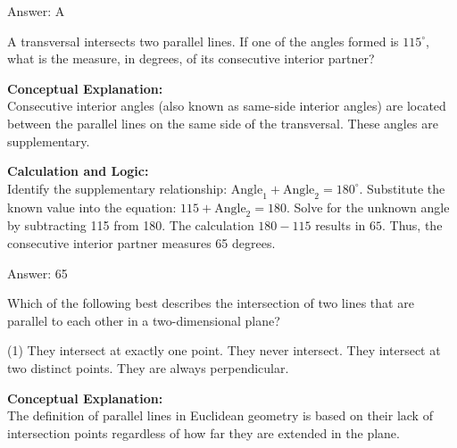 \documentclass[11pt,paper=a4,answers]{exam}
\begin{document}
\begin{questions}
\begin{solution}
\vspace{30pt}

Answer: \colorbox{yellow!100}{A}
\end{solution}

\vspace{60pt}

\question
A transversal intersects two parallel lines. If one of the angles formed is $115^\circ$, what is the measure, in degrees, of its consecutive interior partner?

\begin{solution}
\textbf{Conceptual Explanation:} \\
Consecutive interior angles (also known as same-side interior angles) are located between the parallel lines on the same side of the transversal. These angles are supplementary.

\vspace{30pt}

\textbf{Calculation and Logic:} \\
Identify the supplementary relationship: $\text{Angle}_1 + \text{Angle}_2 = 180^\circ$. Substitute the known value into the equation: $115 + \text{Angle}_2 = 180$. Solve for the unknown angle by subtracting 115 from 180. The calculation $180 - 115$ results in $65$. Thus, the consecutive interior partner measures 65 degrees.

\vspace{30pt}

Answer: \colorbox{yellow!100}{65}
\end{solution}

\vspace{60pt}

\question
Which of the following best describes the intersection of two lines that are parallel to each other in a two-dimensional plane?
\begin{tasks}(1)
    \task They intersect at exactly one point.
    \task They never intersect.
    \task They intersect at two distinct points.
    \task They are always perpendicular.
\end{tasks}

\begin{solution}
\textbf{Conceptual Explanation:} \\
The definition of parallel lines in Euclidean geometry is based on their lack of intersection points regardless of how far they are extended in the plane.


\end{solution}
\end{questions}
\end{document}

